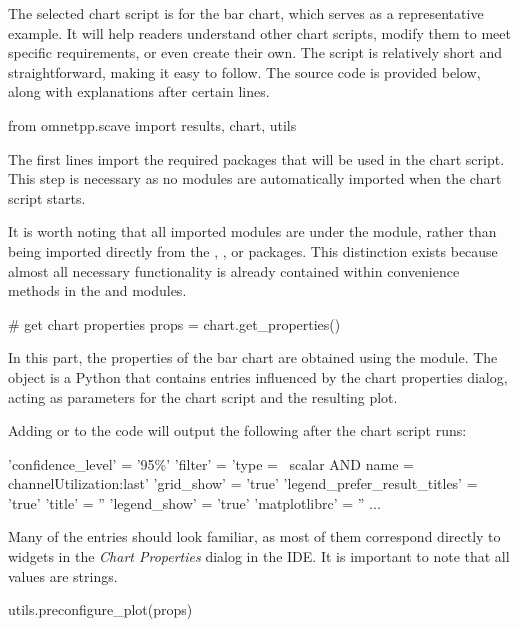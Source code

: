 The selected chart script is for the bar chart, which serves as a representative
example. It will help readers understand other chart scripts, modify them to
meet specific requirements, or even create their own. The script is relatively
short and straightforward, making it easy to follow. The source code is provided
below, along with explanations after certain lines.

\begin{python}
from omnetpp.scave import results, chart, utils
\end{python}

The first lines import the required packages that will be used in the chart
script. This step is necessary as no modules are automatically imported when the
chart script starts.

It is worth noting that all imported modules are under the 
module, rather than being imported directly from the , ,
or  packages. This distinction exists because almost all
necessary functionality is already contained within convenience methods in the
 and  modules.

\begin{python}
# get chart properties
props = chart.get_properties()
\end{python}

In this part, the properties of the bar chart are obtained using the 
module. The  object is a Python  that contains entries
influenced by the chart properties dialog, acting as parameters for the chart
script and the resulting plot.

Adding  or  to the code will output the following after the chart script runs:

\begin{commandline}
'confidence_level' = '95\%'
'filter' = 'type =~ scalar AND name =~ channelUtilization:last'
'grid_show' = 'true'
'legend_prefer_result_titles' = 'true'
'title' = ''
'legend_show' = 'true'
'matplotlibrc' = ''
...
\end{commandline}

Many of the entries should look familiar, as most of them correspond directly to
widgets in the \textit{Chart Properties} dialog in the IDE. It is important to
note that all values are strings.

\begin{python}
utils.preconfigure_plot(props)
\end{python}

